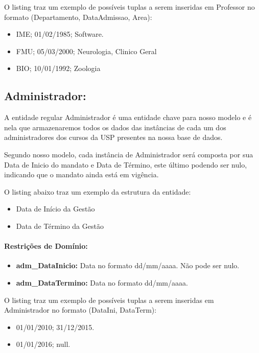 \documentclass{report}
\begin{document}
O listing traz um exemplo de possíveis tuplas a serem inseridas em Professor no formato (Departamento, DataAdmissao, Area):

\begin{itemize}
  \item IME; 01/02/1985; Software. 
  \item FMU; 05/03/2000; Neurologia, Clinico Geral
  \item BIO; 10/01/1992; Zoologia
\end{itemize}

\subsection{Administrador:}
A entidade regular Administrador é uma entidade chave para nosso modelo e é nela que armazenaremos todos os dados das instâncias de cada um dos administradores dos cursos da USP presentes na nossa base de dados.
  
  Segundo nosso modelo, cada instância de Administrador será composta por sua Data de Inicio do mandato e Data de Término, este último podendo ser nulo, indicando que o mandato ainda está em vigência.
    
  O listing abaixo traz um exemplo da estrutura da entidade:
\begin{itemize}
  \item Data de Início da Gestão
  \item Data de Término da Gestão
\end{itemize}
\paragraph{Restrições de Domínio:}
\begin{itemize}
  \item \textbf{adm\_DataInicio:} Data no formato dd/mm/aaaa. Não pode ser nulo.
  \item \textbf{adm\_DataTermino:} Data no formato dd/mm/aaaa.
\end{itemize}
O listing traz um exemplo de possíveis tuplas a serem inseridas em Administrador no formato (DataIni, DataTerm):

\begin{itemize}
  \item 01/01/2010; 31/12/2015. 
  \item 01/01/2016; null.
\end{itemize}
\end{document}
